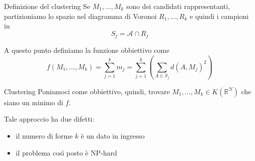 \documentclass{beamer}
\theoremstyle{plain}
\theoremstyle{definition}
\theoremstyle{remark}
\newcommand{\pa}[1]{\left(#1\right)}
\begin{document}
\begin{frame}{Definizione del clustering}
  Se $M_1,...,M_k$ sono dei candidati rappresentanti, partizioniamo lo
  spazio nel diagramma di Voronoi $R_1,...,R_k$ e quindi i campioni in
  \[ S_j = \mathcal{A} \cap R_j \]
  
  \vfill

  A questo punto definiamo la funzione obbiettivo come
  \[ f(M_1,...,M_k) = \sum _{j = 1} ^k m_j = \sum _{j = 1} ^k \pa{ \sum
    _{A \in S_j} d(A,M_j)^2 } \]
\end{frame}

\begin{frame}{Clustering}
  Poniamoci come obbiettivo, quindi, trovare $M_1,...,M_k \in
  K(\mathbb{R}^N)$ che siano un minimo di $f$.
  
  \vfill

  Tale approccio ha due difetti:
  \begin{itemize}
  \item il numero di forme $k$ è un dato in ingresso
  \item il problema così posto è NP-hard
  \end{itemize}
\end{frame}
\end{document}
